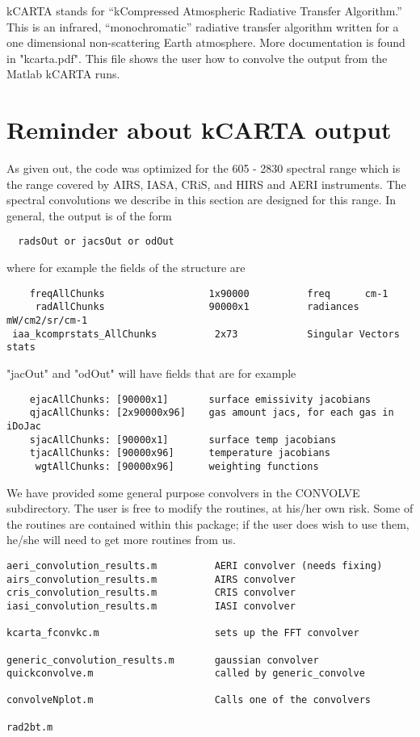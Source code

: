 \documentclass[12pt]{article}
\newcommand{\kc}{\textsf{kCARTA}\xspace}
\begin{document}
\kc stands for ``kCompressed Atmospheric Radiative Transfer
Algorithm.''  This is an infrared, ``monochromatic'' radiative
transfer algorithm written for a one dimensional non-scattering Earth
atmosphere. More documentation is found in "kcarta.pdf". This file 
shows the user how to convolve the output from the Matlab kCARTA runs.

\section{Reminder about kCARTA output}

As given out, the code was optimized for the 605 - 2830 \wn spectral range 
which is the range covered by AIRS, IASA, CRiS, and HIRS and AERI instruments.
The spectral convolutions we describe in this section are designed for this
range. In general, the output is of the form
\begin{verbatim}
  radsOut or jacsOut or odOut
\end{verbatim}

where for example the fields of the structure are
\begin{verbatim}
    freqAllChunks                  1x90000          freq      cm-1
     radAllChunks                  90000x1          radiances mW/cm2/sr/cm-1
 iaa_kcomprstats_AllChunks          2x73            Singular Vectors stats
\end{verbatim}

"jacOut" and "odOut" will have fields that are for example
\begin{verbatim}
    ejacAllChunks: [90000x1]       surface emissivity jacobians
    qjacAllChunks: [2x90000x96]    gas amount jacs, for each gas in iDoJac
    sjacAllChunks: [90000x1]       surface temp jacobians
    tjacAllChunks: [90000x96]      temperature jacobians
     wgtAllChunks: [90000x96]      weighting functions
\end{verbatim}

We have provided some general purpose convolvers in the CONVOLVE subdirectory.
The user is free to modify the routines, at his/her own risk. Some of the routines
are contained within this package; if the user does wish to use them, he/she
will need to get more routines from us.

\begin{verbatim}
aeri_convolution_results.m          AERI convolver (needs fixing)
airs_convolution_results.m          AIRS convolver
cris_convolution_results.m          CRIS convolver
iasi_convolution_results.m          IASI convolver

kcarta_fconvkc.m                    sets up the FFT convolver

generic_convolution_results.m       gaussian convolver
quickconvolve.m                     called by generic_convolve

convolveNplot.m                     Calls one of the convolvers

rad2bt.m
\end{verbatim}
\end{document}
